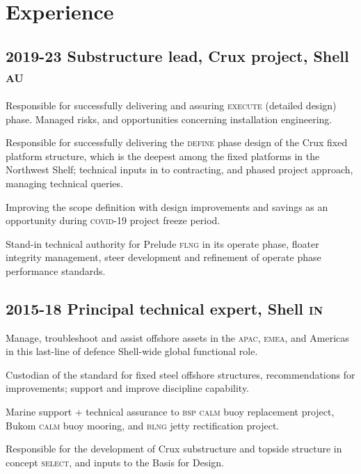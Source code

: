 \section*{Experience} %
\label{sec:exp}

\subsection*{2019-23 Substructure lead, Crux project, Shell \textsc{au}} %
\label{sub:c1}

Responsible for successfully delivering and assuring \textsc{execute} (detailed design) phase. Managed risks, and opportunities concerning installation engineering.

Responsible for successfully delivering the \textsc{define} phase design of the Crux fixed platform structure, which is the deepest among the fixed platforms in the Northwest Shelf; technical inputs in to contracting, and phased project approach, managing technical queries.

Improving the scope definition with design improvements and savings as an opportunity during \textsc{covid-19} project freeze period.

Stand-in technical authority for Prelude \textsc{flng} in its operate phase, floater integrity management, steer development and refinement of operate phase performance standards.


\subsection*{2015-18 Principal technical expert, Shell \textsc{in}} %
\label{sub:c2}

Manage, troubleshoot and assist offshore assets in the \textsc{apac}, \textsc{emea}, and Americas in this last-line of defence Shell-wide global functional role.

Custodian of the standard for fixed steel offshore structures, recommendations for improvements; support and improve discipline capability.

Marine support + technical assurance to \textsc{bsp} \textsc{calm} buoy replacement project, Bukom \textsc{calm} buoy mooring, and \textsc{blng} jetty rectification project.

Responsible for the development of Crux substructure and topside structure in concept \textsc{select}, and inputs to the Basis for Design.


